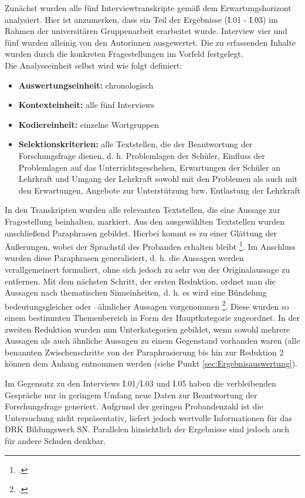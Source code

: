 Zunächst wurden alle fünf Interviewtranskripte gemäß dem Erwartungshorizont analysiert. Hier ist anzumerken, dass ein Teil der Ergebnisse (I.01 - I.03) im Rahmen der universitären Gruppenarbeit erarbeitet wurde. Interview vier und fünf wurden alleinig von den Autorinnen ausgewertet. Die zu erfassenden Inhalte wurden durch die konkreten Fragestellungen im Vorfeld festgelegt.\\

\noindent
Die Analyseeinheit selbst wird wie folgt definiert:

\begin{itemize}
	\item \textbf{Auswertungseinheit:} chronologisch
	\item \textbf{Kontexteinheit:} alle fünf Interviews
	\item \textbf{Kodiereinheit:} einzelne Wortgruppen
	\item \textbf{Selektionskriterien:} alle Textstellen, die der Beantwortung der Forschungsfrage dienen, d. h. Problemlagen der Schüler, Einfluss der Problemlagen auf das Unterrichtsgeschehen, Erwartungen der Schüler an Lehrkraft und Umgang der Lehrkraft sowohl mit den Problemen als auch mit den Erwartungen, Angebote zur Unterstützung bzw. Entlastung der Lehrkraft
\end{itemize}

\noindent
In den Transkripten wurden alle relevanten Textstellen, die eine Aussage zur Fragestellung beinhalten, markiert. Aus den ausgewählten Textstellen wurden anschließend Paraphrasen gebildet. Hierbei kommt es zu einer Glättung der Äußerungen, wobei der Sprachstil des Probanden erhalten bleibt \footcite[vgl.][138]{Krueger2014}. Im Anschluss wurden diese Paraphrasen generalisiert, d. h. die Aussagen werden verallgemeinert formuliert, ohne sich jedoch zu sehr von der Originalaussage zu entfernen. Mit dem nächsten Schritt, der ersten Reduktion, ordnet man die Aussagen nach thematischen Sinneinheiten, d. h. es wird eine Bündelung bedeutungsgleicher oder --ähnlicher Aussagen vorgenommen \footcite[vgl.][139]{Krueger2014}. Diese wurden so einem bestimmten Themenbereich in Form der Hauptkategorie zugeordnet. In der zweiten Reduktion wurden nun Unterkategorien gebildet, wenn sowohl mehrere Aussagen als auch ähnliche Aussagen zu einem Gegenstand vorhanden waren (alle benannten Zwischenschritte von der Paraphrasierung bis hin zur Reduktion 2 können dem Anhang entnommen werden (siehe Punkt \ref{sec:Ergebnisauswertung}).

Im Gegensatz zu den Interviews I.01/I.03 und I.05 haben die verbleibenden Gespräche nur in geringem Umfang neue Daten zur Beantwortung der Forschungsfrage generiert. Aufgrund der geringen Probandenzahl ist die Untersuchung nicht repräsentativ, liefert jedoch wertvolle Informationen für das DRK Bildungswerk SN. Parallelen hinsichtlich der Ergebnisse sind jedoch auch für andere Schulen denkbar.
